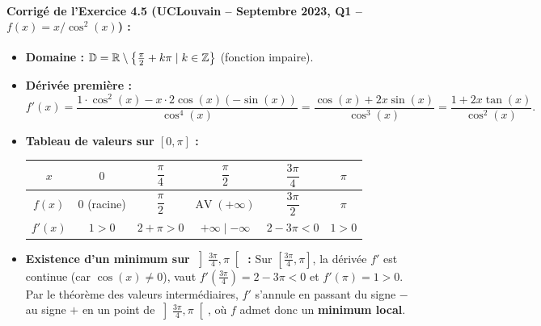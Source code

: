 \paragraph{Corrigé de l'Exercice 4.5 (UCLouvain -- Septembre 2023, Q1 -- $f(x) = x/\cos^2(x)$) :}
\begin{itemize}
    \item \textbf{Domaine :} $\mathbb{D} = \mathbb{R} \setminus \left\{\frac{\pi}{2} + k\pi \mid k \in \mathbb{Z}\right\}$ (fonction impaire).
    \item \textbf{Dérivée première :}
    \[
        f'(x) = \frac{1\cdot\cos^2(x) - x\cdot 2\cos(x)(-\sin(x))}{\cos^4(x)} = \boxed{\frac{\cos(x) + 2x\sin(x)}{\cos^3(x)} = \frac{1 + 2x\tan(x)}{\cos^2(x)}}.
    \]
    \item \textbf{Tableau de valeurs sur $[0, \pi]$ :}
    \begin{center}
    \renewcommand{\arraystretch}{1.35}
    \begin{tabular}{|c||c|c|c|c|c|}
    \hline
    $x$ & $0$ & $\dfrac{\pi}{4}$ & $\dfrac{\pi}{2}$ & $\dfrac{3\pi}{4}$ & $\pi$ \\ \hline\hline
    $f(x)$ & $0$ (racine) & $\dfrac{\pi}{2}$ & $\text{AV}\;(+\infty)$ & $\dfrac{3\pi}{2}$ & $\pi$ \\ \hline
    $f'(x)$ & $1 > 0$ & $2 + \pi > 0$ & $+\infty \mid -\infty$ & $2 - 3\pi < 0$ & $1 > 0$ \\ \hline
    \end{tabular}
    \end{center}
    \item \textbf{Existence d'un minimum sur $\left]\frac{3\pi}{4}, \pi\right[$ :} Sur $\left[\frac{3\pi}{4}, \pi\right]$, la dérivée $f'$ est continue (car $\cos(x) \neq 0$), vaut $f'\left(\frac{3\pi}{4}\right) = 2 - 3\pi < 0$ et $f'(\pi) = 1 > 0$. Par le théorème des valeurs intermédiaires, $f'$ s'annule en passant du signe $-$ au signe $+$ en un point de $\left]\frac{3\pi}{4}, \pi\right[$, où $f$ admet donc un \textbf{minimum local}.
\end{itemize}

